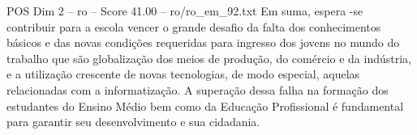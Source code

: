 \begin{textsample}{POS Dim 2 – ro – Score 41.00 – ro/ro\_em\_92.txt}
Em suma, espera -se contribuir para a escola vencer o grande desafio da falta dos conhecimentos básicos e das novas condições requeridas para ingresso dos jovens no mundo do trabalho que são globalização dos meios de produção, do comércio e da indústria, e a utilização crescente de novas tecnologias, de modo especial, aquelas relacionadas com a informatização.
A superação dessa falha na formação dos estudantes do Ensino Médio bem como da Educação Profissional é fundamental para garantir seu desenvolvimento e sua cidadania.

\end{textsample}

